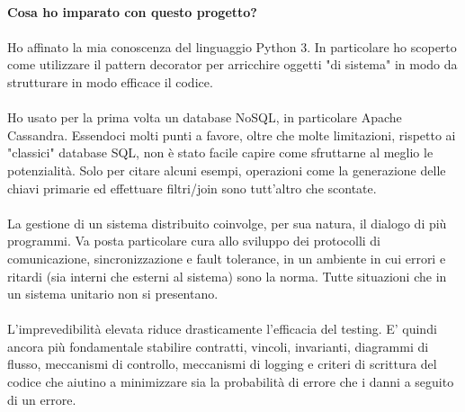 \documentclass[11pt,a4paper,english]{article}
\begin{document}
\paragraph{Cosa ho imparato con questo progetto?}

\paragraph{} Ho affinato la mia conoscenza del linguaggio Python 3. In particolare ho scoperto come utilizzare il pattern decorator per arricchire oggetti "di sistema" in modo da strutturare in modo efficace il codice. 

\paragraph{} Ho usato per la prima volta un database NoSQL, in particolare Apache Cassandra. Essendoci molti punti a favore, oltre che molte limitazioni, rispetto ai "classici" database SQL, non è stato facile capire come sfruttarne al meglio le potenzialità. Solo per citare alcuni esempi, operazioni come la generazione delle chiavi primarie ed effettuare filtri/join sono tutt'altro che scontate. 

\paragraph{} La gestione di un sistema distribuito coinvolge, per sua natura, il dialogo di più programmi. Va posta particolare cura allo sviluppo dei protocolli di comunicazione, sincronizzazione e fault tolerance, in un ambiente in cui errori e ritardi (sia interni che esterni al sistema) sono la norma. Tutte situazioni che in un sistema unitario non si presentano. 

\paragraph{} L'imprevedibilità elevata riduce drasticamente l'efficacia del testing. E' quindi ancora più fondamentale stabilire contratti, vincoli, invarianti, diagrammi di flusso, meccanismi di controllo, meccanismi di logging e criteri di scrittura del codice che aiutino a minimizzare sia la probabilità di errore che i danni a seguito di un errore. 



\end{document}
